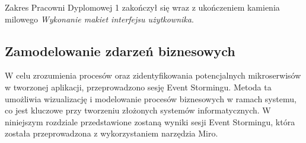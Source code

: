 Zakres Pracowni Dyplomowej 1 zakończył się wraz z ukończeniem kamienia milowego \textit{Wykonanie makiet interfejsu użytkownika}.

\subsection{Zamodelowanie zdarzeń biznesowych}

W celu zrozumienia procesów oraz zidentyfikowania potencjalnych mikroserwisów w tworzonej aplikacji, przeprowadzono sesję Event Stormingu. Metoda ta umożliwia wizualizację i modelowanie procesów biznesowych w ramach systemu, co jest kluczowe przy tworzeniu złożonych systemów informatycznych. W niniejszym rozdziale przedstawione zostaną wyniki sesji Event Stormingu, która została przeprowadzona z wykorzystaniem narzędzia Miro.

